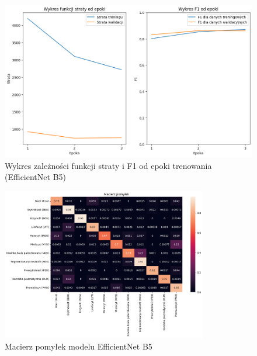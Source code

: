\begin{figure}
    \centering
    \includegraphics[width=\textwidth]{experiments/efficientnet_b5/combined}
    \caption{Wykres zależności funkcji straty i F1 od epoki trenowania (EfficientNet B5)}
    \label{fig:plot_efficientnet_b5}
\end{figure}
\begin{figure}
    \centering
    \includegraphics[width=0.8\textwidth]{experiments/efficientnet_b5/confusion_matrix}
    \caption{Macierz pomyłek modelu EfficientNet B5}
    \label{fig:confusion_efficientnet_b5}
\end{figure}


